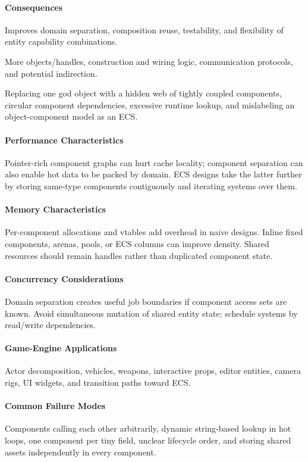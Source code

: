 \documentclass[11pt]{article}
\begin{document}
\paragraph{Consequences}
\begin{description}[leftmargin=2.7cm,style=nextline]
\item[Benefits] Improves domain separation, composition reuse, testability, and flexibility of entity capability combinations.
\item[Costs] More objects/handles, construction and wiring logic, communication protocols, and potential indirection.
\item[Risks] Replacing one god object with a hidden web of tightly coupled components, circular component dependencies, excessive runtime lookup, and mislabeling an object-component model as an ECS.
\end{description}
\paragraph{Performance Characteristics} Pointer-rich component graphs can hurt cache locality; component separation can also enable hot data to be packed by domain. ECS designs take the latter further by storing same-type components contiguously and iterating systems over them.
\paragraph{Memory Characteristics} Per-component allocations and vtables add overhead in naive designs. Inline fixed components, arenas, pools, or ECS columns can improve density. Shared resources should remain handles rather than duplicated component state.
\paragraph{Concurrency Considerations} Domain separation creates useful job boundaries if component access sets are known. Avoid simultaneous mutation of shared entity state; schedule systems by read/write dependencies.
\paragraph{Game-Engine Applications} Actor decomposition, vehicles, weapons, interactive props, editor entities, camera rigs, UI widgets, and transition paths toward ECS.
\paragraph{Common Failure Modes} Components calling each other arbitrarily, dynamic string-based lookup in hot loops, one component per tiny field, unclear lifecycle order, and storing shared assets independently in every component.
\end{document}
